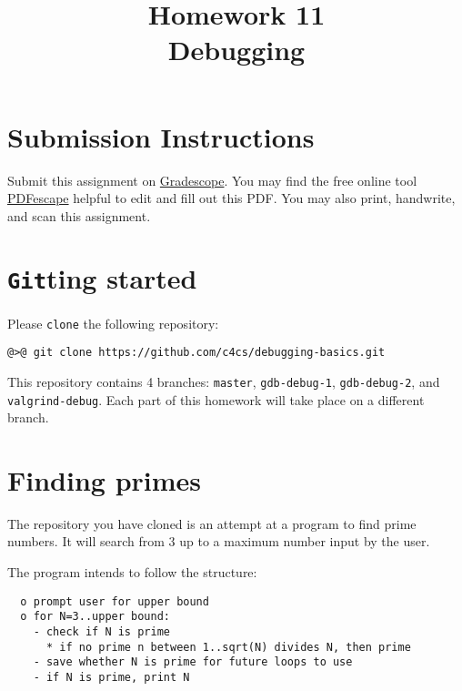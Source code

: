 \documentclass{article}
\begin{document}
\fancyhead[L]{}
\fancyhead[R]{}

\fancyfoot[C]{\color{gray} \thepage~/~\pageref*{LastPage}}
\pagestyle{fancyplain}

\title{\textbf{Homework 11\\Debugging}}
\author{\textbf{\color{red}{Due: Wednesday, March 28th, 11:59PM (Hard Deadline)}}}
\date{}
\maketitle


\section*{Submission Instructions}
Submit this assignment on \href{https://gradescope.com/courses/13649}{Gradescope}.
You may find the free online tool \href{https://www.pdfescape.com}{PDFescape}
helpful to edit and fill out this PDF.
You may also print, handwrite, and scan this assignment.

\newpage
\section{\texttt{Git}ting started}

Please \texttt{clone} the following repository:

\begin{lstlisting}
@>@ git clone https://github.com/c4cs/debugging-basics.git
\end{lstlisting}

This repository contains 4 branches: \texttt{master}, \texttt{gdb-debug-1}, \texttt{gdb-debug-2}, and \texttt{valgrind-debug}. Each part of this homework will take place on a different branch.

\section{Finding primes}

The repository you have cloned is an attempt at a program to find prime
numbers. It will search from 3 up to a maximum number input by the user.

The program intends to follow the structure:
\begin{lstlisting}
  o prompt user for upper bound
  o for N=3..upper bound:
    - check if N is prime
      * if no prime n between 1..sqrt(N) divides N, then prime
    - save whether N is prime for future loops to use
    - if N is prime, print N
\end{lstlisting}
\end{document}

